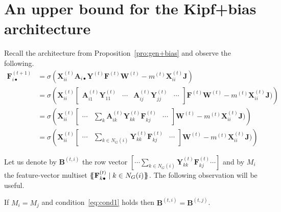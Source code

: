 \section{An upper bound for the Kipf+bias architecture}
Recall the architecture from Proposition~\ref{pro:gen+bias}
and observe the following.
\begin{align}
    \mathbf{F}^{(t+1)}_{i\bullet} &= \sigma(
        \mathbf{X}^{(t)}_{ii} \mathbf{A}_{i\bullet}
        \mathbf{Y}^{(t)}\mathbf{F}^{(t)}\mathbf{W}^{(t)}
        -m^{(t)}\mathbf{X}_{ii}^{(t)}\mathbf{J})\\
    &= \sigma \left(
        \mathbf{X}^{(t)}_{ii}
        \begin{bmatrix}
        \mathbf{A}^{(t)}_{i1} \mathbf{Y}^{(t)}_{11} &
        \cdots & \mathbf{A}^{(t)}_{ij} \mathbf{Y}^{(t)}_{jj} & \cdots
        \end{bmatrix}
        \mathbf{F}^{(t)}\mathbf{W}^{(t)}
        -m^{(t)}\mathbf{X}_{ii}^{(t)}\mathbf{J})
        \right)\\
    &= \sigma \left(
        \mathbf{X}^{(t)}_{ii}
        \begin{bmatrix}
        \cdots &
        \sum_{k}\mathbf{A}^{(t)}_{ik} \mathbf{Y}^{(t)}_{kk} \mathbf{F}^{(t)}_{k j}  & \cdots
        \end{bmatrix}
        \mathbf{W}^{(t)}
        -m^{(t)}\mathbf{X}_{ii}^{(t)}\mathbf{J})
        \right)\\
    &= \sigma \left(
        \mathbf{X}^{(t)}_{ii}
        \begin{bmatrix}
        \cdots & \sum_{k \in N_G(i)} \mathbf{Y}^{(t)}_{kk} \mathbf{F}^{(t)}_{k j} & \cdots
        \end{bmatrix}
        \mathbf{W}^{(t)}
        -m^{(t)}\mathbf{X}_{ii}^{(t)}\mathbf{J})
        \right)\label{eq:fkn-indices}
\end{align}

Let us denote by $\mathbf{B}^{(t,i)}$ the row vector $[
\cdots \sum_{k \in N_G(i)} \mathbf{Y}^{(t)}_{kk} \mathbf{F}^{(t)}_{k j} \cdots]$ and by $M_i$ the feature-vector multiset $\{\!\!\{ \mathbf{F}^{(t)}_{k\bullet} \mathrel{\mid} k \in N_G(i) \}\!\!\}$. The following
observation will be useful.
\begin{lemma}\label{lem:dumb-obs}
    If $M_i = M_{j}$ and
    condition~\eqref{eq:cond1} holds
    then $\mathbf{B}^{(t,i)} = \mathbf{B}^{(t,j)}$.
\end{lemma}

